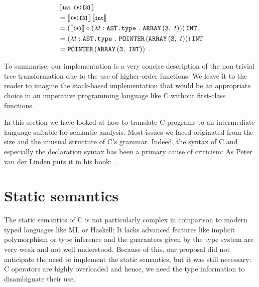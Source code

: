 \documentclass[a4paper,12pt]{scrbook}
\theoremstyle{plain}
\theoremstyle{definition}
\newcommand{\cc}[1]{{\text{\footnotesize\ttfamily{#1}}}}
\newcommand{\ckw}[1]{{\text{\footnotesize\bfseries\ttfamily{#1}}}}
\begin{document}
\begin{align*}
&\left\llbracket \ckw{int} ~ \cc{(} \ckw{*} \cc{)} \cc{[3]} \right\rrbracket \\
&= \left\llbracket \cc{(} \ckw{*} \cc{)} \cc{[3]} \right\rrbracket
\left\llbracket \ckw{int} \right\rrbracket \\
&= \left(\left\llbracket \cc{(} \ckw{*} \cc{)} \right\rrbracket \circ \left( \lambda t : \texttt{AST.type} ~.~ \texttt{ARRAY} \left(\texttt{3},~ t\right)
  \right)\right)\texttt{INT} \\
&= \left( \lambda t : \texttt{AST.type} ~.~ \texttt{POINTER}
  \left(\texttt{ARRAY} \left(\texttt{3},~ t\right)\right) \right) \texttt{INT}
\\
&= \texttt{POINTER}
  \left(\texttt{ARRAY} \left(\texttt{3},~ \texttt{INT}\right)\right) ~.
\end{align*}

To summarise, our implementation is a very concise description of the
non-trivial tree transformation due to the use of higher-order functions. We
leave it to the reader to imagine the stack-based implementation that would be
an appropriate choice in an imperative programming language like C without
first-class functions.

In this section we have looked at how to translate C programs to an intermediate
language suitable for semantic analysis. Most issues we faced originated from
the size and the unusual structure of C's grammar. Indeed, the syntax of C and
especially the declaration syntax has been a primary cause of criticism: As
Peter van der Linden puts it in his  book:
 \cite[p. 65]{expertC}.

\section{Static semantics}\label{staticSemantics}
The static semantics of C is not particularly complex in comparison to modern
typed languages like ML or Haskell: It lacks advanced features like implicit
polymorphism or type inference and the guarantees given by the type system are
very weak and not well understood. Because of this, our proposal did not
anticipate the need to implement the static semantics, but it was still
necessary: C operators are highly overloaded and hence, we need the type
information to disambiguate their use.
\end{document}
